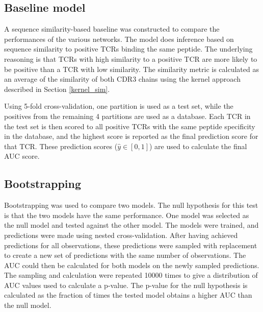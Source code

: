 
\subsection{Baseline model}
A sequence similarity-based baseline was constructed to compare the performances of the various networks. The model does inference based on sequence similarity to positive TCRs binding the same peptide. The underlying reasoning is that TCRs with high similarity to a positive TCR are more likely to be positive than a TCR with low similarity. The similarity metric is calculated as an average of the similarity of both CDR3 chains using the kernel approach described in Section \ref{kernel_sim}.

Using 5-fold cross-validation, one partition is used as a test set, while the positives from the remaining 4 partitions are used as a database. Each TCR in the test set is then scored to all positive TCRs with the same peptide specificity in the database, and the highest score is reported as the final prediction score for that TCR. These prediction scores ($\hat{y}\in[0,1]$) are used to calculate the final AUC score.

\subsection{Bootstrapping}
Bootstrapping was used to compare two models. The null hypothesis for this test is that the two models have the same performance. One model was selected as the null model and tested against the other model. The models were trained, and predictions were made using nested cross-validation. After having achieved predictions for all observations, these predictions were sampled with replacement to create a new set of predictions with the same number of observations. The AUC could then be calculated for both models on the newly sampled predictions. The sampling and calculation were repeated 10000 times to give a distribution of AUC values used to calculate a p-value. The p-value for the null hypothesis is calculated as the fraction of times the tested model obtains a higher AUC than the null model.